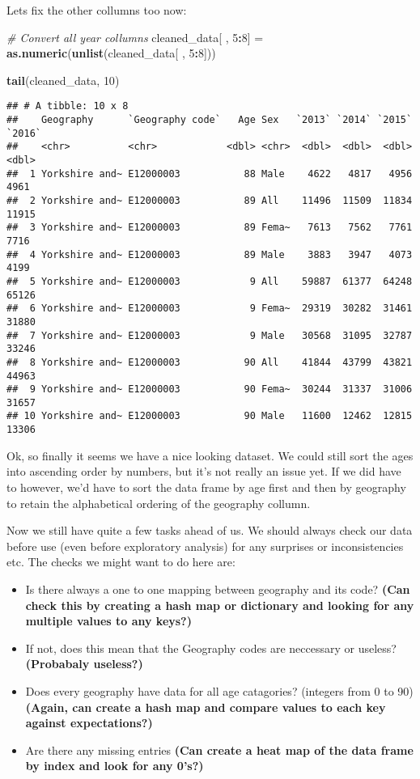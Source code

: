 \documentclass[]{article}
\newenvironment{Shaded}{\begin{snugshade}}{\end{snugshade}}
\newcommand{\KeywordTok}[1]{\textcolor[rgb]{0.13,0.29,0.53}{\textbf{#1}}}
\newcommand{\DecValTok}[1]{\textcolor[rgb]{0.00,0.00,0.81}{#1}}
\newcommand{\StringTok}[1]{\textcolor[rgb]{0.31,0.60,0.02}{#1}}
\newcommand{\CommentTok}[1]{\textcolor[rgb]{0.56,0.35,0.01}{\textit{#1}}}
\newcommand{\OperatorTok}[1]{\textcolor[rgb]{0.81,0.36,0.00}{\textbf{#1}}}
\newcommand{\NormalTok}[1]{#1}
\providecommand{\tightlist}{%
  \setlength{\itemsep}{0pt}\setlength{\parskip}{0pt}}
\begin{document}
Lets fix the other collumns too now:

\begin{Shaded}
\begin{Highlighting}[]
\CommentTok{# Convert all year collumns}
\NormalTok{cleaned_data[ , }\DecValTok{5}\OperatorTok{:}\DecValTok{8}\NormalTok{] =}\StringTok{ }\KeywordTok{as.numeric}\NormalTok{(}\KeywordTok{unlist}\NormalTok{(cleaned_data[ , }\DecValTok{5}\OperatorTok{:}\DecValTok{8}\NormalTok{]))}

\KeywordTok{tail}\NormalTok{(cleaned_data, }\DecValTok{10}\NormalTok{)}
\end{Highlighting}
\end{Shaded}

\begin{verbatim}
## # A tibble: 10 x 8
##    Geography      `Geography code`   Age Sex   `2013` `2014` `2015` `2016`
##    <chr>          <chr>            <dbl> <chr>  <dbl>  <dbl>  <dbl>  <dbl>
##  1 Yorkshire and~ E12000003           88 Male    4622   4817   4956   4961
##  2 Yorkshire and~ E12000003           89 All    11496  11509  11834  11915
##  3 Yorkshire and~ E12000003           89 Fema~   7613   7562   7761   7716
##  4 Yorkshire and~ E12000003           89 Male    3883   3947   4073   4199
##  5 Yorkshire and~ E12000003            9 All    59887  61377  64248  65126
##  6 Yorkshire and~ E12000003            9 Fema~  29319  30282  31461  31880
##  7 Yorkshire and~ E12000003            9 Male   30568  31095  32787  33246
##  8 Yorkshire and~ E12000003           90 All    41844  43799  43821  44963
##  9 Yorkshire and~ E12000003           90 Fema~  30244  31337  31006  31657
## 10 Yorkshire and~ E12000003           90 Male   11600  12462  12815  13306
\end{verbatim}

Ok, so finally it seems we have a nice looking dataset. We could still
sort the ages into ascending order by numbers, but it's not really an
issue yet. If we did have to however, we'd have to sort the data frame
by age first and then by geography to retain the alphabetical ordering
of the geography collumn.

Now we still have quite a few tasks ahead of us. We should always check
our data before use (even before exploratory analysis) for any surprises
or inconsistencies etc. The checks we might want to do here are:

\begin{itemize}
\tightlist
\item
  Is there always a one to one mapping between geography and its code?
  \textbf{(Can check this by creating a hash map or dictionary and
  looking for any multiple values to any keys?)}
\item
  If not, does this mean that the Geography codes are neccessary or
  useless? \textbf{(Probabaly useless?)}
\item
  Does every geography have data for all age catagories? (integers from
  0 to 90) \textbf{(Again, can create a hash map and compare values to
  each key against expectations?)}
\item
  Are there any missing entries \textbf{(Can create a heat map of the
  data frame by index and look for any 0's?)}
\end{itemize}
\end{document}
